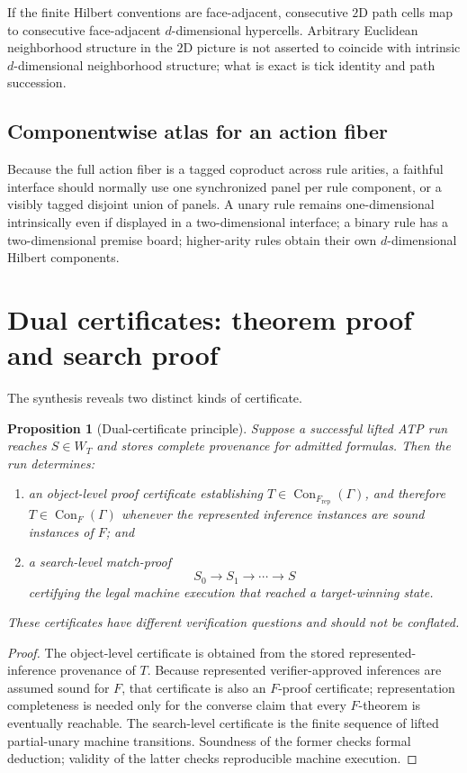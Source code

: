 \documentclass[11pt]{article}
\newtheorem{proposition}[theorem]{Proposition}
\theoremstyle{definition}
\newcommand{\Con}{\operatorname{Con}}
\begin{document}
If the finite Hilbert conventions are face-adjacent, consecutive $2$D path cells map to consecutive face-adjacent $d$-dimensional hypercells. Arbitrary Euclidean neighborhood structure in the $2$D picture is not asserted to coincide with intrinsic $d$-dimensional neighborhood structure; what is exact is tick identity and path succession.

\subsection{Componentwise atlas for an action fiber}

Because the full action fiber is a tagged coproduct across rule arities, a faithful interface should normally use one synchronized panel per rule component, or a visibly tagged disjoint union of panels. A unary rule remains one-dimensional intrinsically even if displayed in a two-dimensional interface; a binary rule has a two-dimensional premise board; higher-arity rules obtain their own $d$-dimensional Hilbert components.

\section{Dual certificates: theorem proof and search proof}

The synthesis reveals two distinct kinds of certificate.

\begin{proposition}[Dual-certificate principle]\label{prop:dual-cert}
Suppose a successful lifted ATP run reaches $S\in W_T$ and stores complete provenance for admitted formulas. Then the run determines:
\begin{enumerate}[label=(\roman*)]
\item an object-level proof certificate establishing $T\in\Con_{F_{\mathrm{rep}}}(\Gamma)$, and therefore $T\in\Con_F(\Gamma)$ whenever the represented inference instances are sound instances of $F$; and
\item a search-level match-proof
\[
S_0\to S_1\to\cdots\to S
\]
certifying the legal machine execution that reached a target-winning state.
\end{enumerate}
These certificates have different verification questions and should not be conflated.
\end{proposition}

\begin{proof}
The object-level certificate is obtained from the stored represented-inference provenance of $T$. Because represented verifier-approved inferences are assumed sound for $F$, that certificate is also an $F$-proof certificate; representation completeness is needed only for the converse claim that every $F$-theorem is eventually reachable. The search-level certificate is the finite sequence of lifted partial-unary machine transitions. Soundness of the former checks formal deduction; validity of the latter checks reproducible machine execution.
\end{proof}
\end{document}
